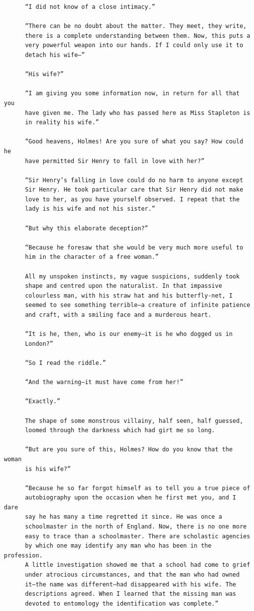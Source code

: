 \documentclass{article}
\begin{document}
\begin{verbatim}
      “I did not know of a close intimacy.”

      “There can be no doubt about the matter. They meet, they write,
      there is a complete understanding between them. Now, this puts a
      very powerful weapon into our hands. If I could only use it to
      detach his wife—”

      “His wife?”

      “I am giving you some information now, in return for all that you
      have given me. The lady who has passed here as Miss Stapleton is
      in reality his wife.”

      “Good heavens, Holmes! Are you sure of what you say? How could he
      have permitted Sir Henry to fall in love with her?”

      “Sir Henry’s falling in love could do no harm to anyone except
      Sir Henry. He took particular care that Sir Henry did not make
      love to her, as you have yourself observed. I repeat that the
      lady is his wife and not his sister.”

      “But why this elaborate deception?”

      “Because he foresaw that she would be very much more useful to
      him in the character of a free woman.”

      All my unspoken instincts, my vague suspicions, suddenly took
      shape and centred upon the naturalist. In that impassive
      colourless man, with his straw hat and his butterfly-net, I
      seemed to see something terrible—a creature of infinite patience
      and craft, with a smiling face and a murderous heart.

      “It is he, then, who is our enemy—it is he who dogged us in
      London?”

      “So I read the riddle.”

      “And the warning—it must have come from her!”

      “Exactly.”

      The shape of some monstrous villainy, half seen, half guessed,
      loomed through the darkness which had girt me so long.

      “But are you sure of this, Holmes? How do you know that the woman
      is his wife?”

      “Because he so far forgot himself as to tell you a true piece of
      autobiography upon the occasion when he first met you, and I dare
      say he has many a time regretted it since. He was once a
      schoolmaster in the north of England. Now, there is no one more
      easy to trace than a schoolmaster. There are scholastic agencies
      by which one may identify any man who has been in the profession.
      A little investigation showed me that a school had come to grief
      under atrocious circumstances, and that the man who had owned
      it—the name was different—had disappeared with his wife. The
      descriptions agreed. When I learned that the missing man was
      devoted to entomology the identification was complete.”


\end{verbatim}
\end{document}
